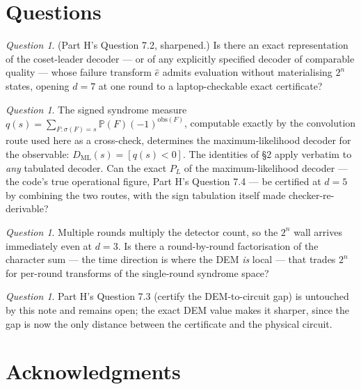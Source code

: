 \documentclass[11pt]{amsart}
\newcommand{\PL}{P_{L}}
\newcommand{\sig}{\sigma}
\newcommand{\obs}{\mathrm{obs}}
\newcommand{\Prb}{\mathbb{P}}
\theoremstyle{plain}
\theoremstyle{definition}
\theoremstyle{remark}
\newtheorem{question}[theorem]{Question}
\begin{document}
\section{Questions}\label{sec:questions}

\begin{question}
(Part H's Question 7.2, sharpened.) Is there an exact representation of the
coset-leader decoder --- or of any explicitly specified decoder of
comparable quality --- whose failure transform $\widehat{e}$ admits
evaluation without materialising $2^n$ states, opening $d = 7$ at one round
to a laptop-checkable exact certificate?
\end{question}

\begin{question}\label{q:ml}
The signed syndrome measure $q(s) = \sum_{F : \sig(F) = s} \Prb(F)
(-1)^{\obs(F)}$, computable exactly by the convolution route used here as a
cross-check, determines the maximum-likelihood decoder for the observable:
$D_{\mathrm{ML}}(s) = [q(s) < 0]$. The identities of \S2 apply verbatim to
\emph{any} tabulated decoder. Can the exact $\PL$ of the maximum-likelihood
decoder --- the code's true operational figure, Part H's Question 7.4 ---
be certified at $d = 5$ by combining the two routes, with the sign
tabulation itself made checker-re-derivable?
\end{question}

\begin{question}
Multiple rounds multiply the detector count, so the $2^n$ wall arrives
immediately even at $d = 3$. Is there a round-by-round factorisation of the
character sum --- the time direction is where the DEM \emph{is} local ---
that trades $2^n$ for per-round transforms of the single-round syndrome
space?
\end{question}

\begin{question}
Part H's Question 7.3 (certify the DEM-to-circuit gap) is untouched by this
note and remains open; the exact DEM value makes it sharper, since the gap
is now the only distance between the certificate and the physical circuit.
\end{question}

\section*{Acknowledgments}
\end{document}
